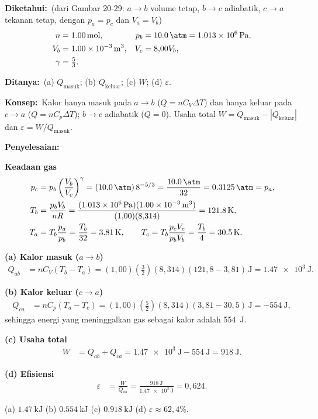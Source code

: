 \documentclass[12pt,a4paper]{article}
\newcommand{\diketahui}{\par\medskip\noindent\textbf{Diketahui:}}
\newcommand{\ditanya}{\par\medskip\noindent\textbf{Ditanya:}}
\newcommand{\konsep}{\par\medskip\noindent\textbf{Konsep:}}
\newcommand{\penyelesaian}{\par\medskip\noindent\textbf{Penyelesaian:}\par\nopagebreak}
\begin{document}
\diketahui\ (dari Gambar 20-29: $a\to b$ volume tetap, $b\to c$ adiabatik, $c\to a$ tekanan tetap, dengan $p_a=p_c$ dan $V_a=V_b$)
\begin{align*}
n &= \SI{1,00}{\mole},&
p_b &= \SI{10,0}{\atm}=\SI{1,013e6}{\pascal},\\
V_b &= \SI{1,00e-3}{\metre\cubed},&
V_c &= 8{,}00V_b,\\
\gamma &= \tfrac53.
\end{align*}
\ditanya\ (a) $Q_{\text{masuk}}$; (b) $Q_{\text{keluar}}$; (c) $W$; (d) $\varepsilon$.

\konsep\ Kalor hanya masuk pada $a\to b$ ($Q=nC_V\Delta T$) dan hanya keluar pada $c\to a$ ($Q=nC_p\Delta T$); $b\to c$ adiabatik ($Q=0$). Usaha total $W=Q_{\text{masuk}}-|Q_{\text{keluar}}|$ dan $\varepsilon=W/Q_{\text{masuk}}$.

\penyelesaian

\noindent\textbf{Keadaan gas}
\begin{align*}
p_c &= p_b\left(\frac{V_b}{V_c}\right)^{\gamma} = (\SI{10,0}{\atm})\,8^{-5/3} = \frac{\SI{10,0}{\atm}}{32}=\SI{0,3125}{\atm}=p_a,\\
T_b &= \frac{p_bV_b}{nR}=\frac{(\SI{1,013e6}{\pascal})(\SI{1,00e-3}{\metre\cubed})}{(1{,}00)(8{,}314)}=\SI{121,8}{\kelvin},\\
T_a &= T_b\frac{p_a}{p_b}=\frac{T_b}{32}=\SI{3,81}{\kelvin},\qquad
T_c = T_b\frac{p_cV_c}{p_bV_b}=\frac{T_b}{4}=\SI{30,5}{\kelvin}.
\end{align*}

\noindent\textbf{(a) Kalor masuk ($a\to b$)}
\begin{align*}
Q_{ab} &= nC_V(T_b-T_a) = (1{,}00)(\tfrac32)(8{,}314)(121{,}8-3{,}81)\,\si{\joule} = \SI{1,47e3}{\joule}.
\end{align*}

\noindent\textbf{(b) Kalor keluar ($c\to a$)}
\begin{align*}
Q_{ca} &= nC_p(T_a-T_c) = (1{,}00)(\tfrac52)(8{,}314)(3{,}81-30{,}5)\,\si{\joule} = -\SI{554}{\joule},
\end{align*}
sehingga energi yang meninggalkan gas sebagai kalor adalah \SI{554}{\joule}.

\noindent\textbf{(c) Usaha total}
\begin{align*}
W &= Q_{ab}+Q_{ca} = \SI{1,47e3}{\joule}-\SI{554}{\joule} = \SI{918}{\joule}.
\end{align*}

\noindent\textbf{(d) Efisiensi}
\begin{align*}
\varepsilon &= \frac{W}{Q_{ab}} = \frac{\SI{918}{\joule}}{\SI{1,47e3}{\joule}} = 0{,}624.
\end{align*}
\begin{jawaban}
(a) $\SI{1,47}{\kilo\joule}$ \quad (b) $\SI{0,554}{\kilo\joule}$ \quad (c) $\SI{0,918}{\kilo\joule}$ \quad (d) $\varepsilon\approx62{,}4\%$.
\end{jawaban}
\end{document}
